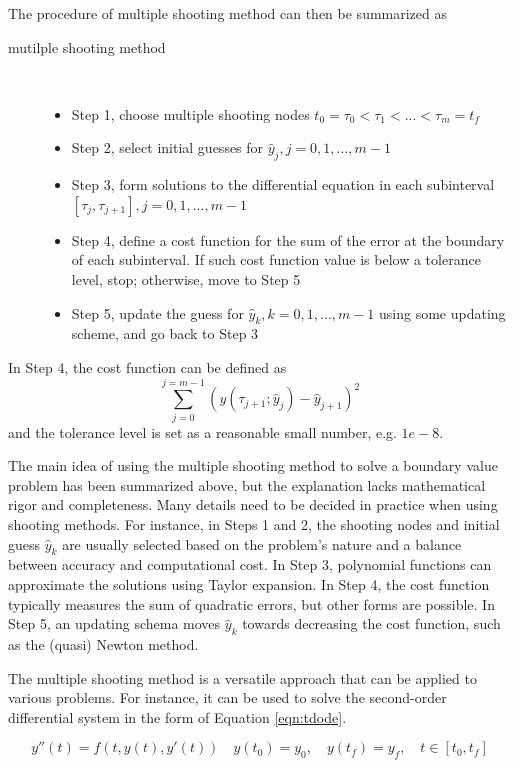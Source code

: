 \documentclass  [
  paper    = a4,
  BCOR     = 10mm,
  twoside,
  fontsize = 12pt,
  fleqn,
  toc      = bibnumbered,
  toc      = listofnumbered,
  numbers  = noendperiod,
  headings = normal,
  listof   = leveldown,
  version  = 3.03
]                                       {scrreprt}
\newcommand{\<}{\langle}
\renewcommand{\>}{\rangle}
\begin{document}
The procedure of multiple shooting method can then be summarized as
\begin{description}
	\item[mutilple shooting method] \
	\begin{itemize}
		\item Step 1, choose multiple shooting nodes $t_0 = \tau_0 < \tau_1 < ... < \tau_m = t_f$ 
		\item Step 2, select initial guesses for $\hat{y}_j, j = 0, 1, ..., m-1$ 
		\item Step 3, form solutions to the differential equation in each subinterval $[\tau_j, \tau_{j+1}], j= 0, 1, ..., m-1$
		\item Step 4, define a cost function for the sum of the error at the boundary of each subinterval. If such cost function value is below a tolerance level, stop; otherwise, move to Step 5
		\item Step 5, update the guess for $\hat{y}_k, k = 0, 1, ..., m-1$ using some updating scheme, and go back to Step 3
	\end{itemize}
\end{description}
In Step 4, the cost function can be defined as 
\begin{equation}
	\sum_{j=0}^{j=m-1}(y(\tau_{j+1}; \hat{y}_j) - \hat{y}_{j+1})^2
\end{equation}
and the tolerance level is set as a reasonable small number, e.g. $1e-8$.

The main idea of using the multiple shooting method to solve a boundary value problem has been summarized above, but the explanation lacks mathematical rigor and completeness. Many details need to be decided in practice when using shooting methods. For instance, in Steps 1 and 2, the shooting nodes and initial guess $\hat{y}_k$ are usually selected based on the problem's nature and a balance between accuracy and computational cost. In Step 3, polynomial functions can approximate the solutions using Taylor expansion. In Step 4, the cost function typically measures the sum of quadratic errors, but other forms are possible. In Step 5, an updating schema moves $\hat{y}_k$ towards decreasing the cost function, such as the (quasi) Newton method.


The multiple shooting method is a versatile approach that can be applied to various problems. For instance, it can be used to solve the second-order differential system in the form of Equation \ref{eqn:tdode}. 




\begin{equation}
	y''(t) = f(t, y(t), y'(t))  \quad y(t_0) = y_0, \quad y(t_f) = y_f,  \quad t \in [t_0, t_f]
	\label{eqn:tdode}
\end{equation}
\end{document}
